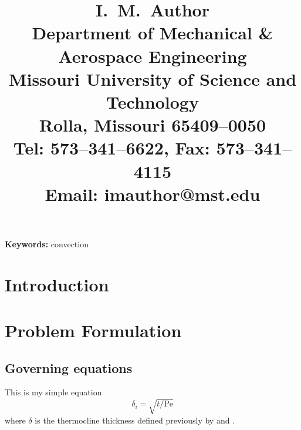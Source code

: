 \documentclass{article}
\newcommand{\ThesisPaperAuthor}[1]{\title{#1}}
\newenvironment{ThesisPaperAbstract}{\begin{abstract}}{\end{abstract}}
\newcommand{\ThesisPaperKeywords}[1]{\textbf{Keywords:} #1}
\begin{document}

\ThesisPaperAuthor{%
 I.\ M.\ Author\\%
 Department of Mechanical \& Aerospace Engineering\\
 Missouri University of Science and Technology\\
 Rolla, Missouri 65409--0050\\
 Tel: 573--341--6622, Fax: 573--341--4115\\
 Email: imauthor@mst.edu%
}




\begin{ThesisPaperAbstract}
\lipsum[52-55]
\end{ThesisPaperAbstract}


\ThesisPaperKeywords{convection}


\section{Introduction}

\lipsum[52-55]


\section{Problem Formulation}%
  \label{sec:formulation}

\lipsum[56]
\subsection{Governing equations}

This is my simple equation
\begin{equation}
\delta_i = \sqrt{t/\mathrm{Pe}}
\end{equation}
where $\delta$ is the thermocline
thickness %
defined previously by \citep{bullwinkle.1990} and
\citet{bullwinkle.1991}. \lipsum[57-60]
\end{document}
